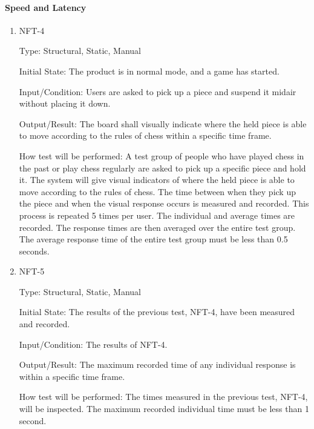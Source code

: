 \documentclass[12pt, titlepage]{article}
\begin{document}
\paragraph{Speed and Latency}
\begin{enumerate}
    \item{NFT-4}

        Type: Structural, Static, Manual
                            
        Initial State: The product is in normal mode, and a game has started.
                            
        Input/Condition: Users are asked to pick up a piece and suspend it midair without placing it down.
                            
        Output/Result: The board shall visually indicate where the held piece is able to move according to the rules of chess within a specific time frame.
                            
        How test will be performed: A test group of people who have played chess in the past or play chess regularly are asked to pick up a specific piece and 
            hold it. The system will give visual indicators of where the held piece is able to move according to the rules of chess. The time between when 
            they pick up the piece and when the visual response occurs is measured and recorded. This process is repeated 5 times per user. The individual and average
            times are recorded. The response times are then averaged over the entire test group. The average response time of the entire test group must be less than 
            0.5 seconds.
                        
    \item{NFT-5}

        Type: Structural, Static, Manual
                            
        Initial State: The results of the previous test, NFT-4, have been measured and recorded.
                            
        Input/Condition: The results of NFT-4.
                            
        Output/Result: The maximum recorded time of any individual response is within a specific time frame.
                            
        How test will be performed: The times measured in the previous test, NFT-4, will be inspected. The maximum recorded individual time must be less than 
            1 second.


\end{enumerate}
\end{document}
